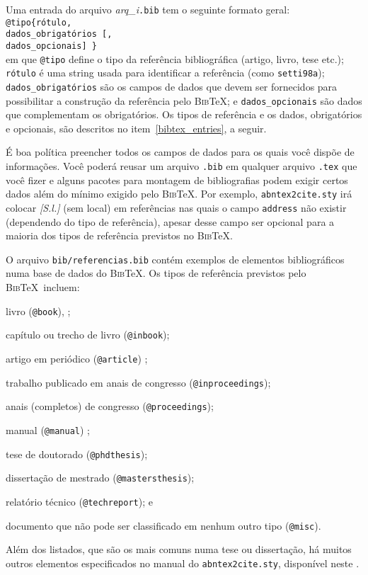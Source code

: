 Uma entrada do arquivo \emph{arq\_i}\texttt{.bib} tem o seguinte formato
geral:\\
\hspace*{3em}\verb|@tipo{rótulo,|\\
	\hspace*{5em}\verb|dados_obrigatórios [,|\\ 
	\hspace*{5em}\verb|dados_opcionais] }| \\
em que \verb|@tipo| define o tipo da referência 
   			bibliográfica (artigo, livro, tese etc.); 
	\texttt{rótulo} é uma string usada para 
			identificar a referência (como \texttt{setti98a});
	\texttt{dados\_obrigatórios} são os campos de dados que 
   			devem ser fornecidos para possibilitar a construção 
   			da referência pelo \textsc{Bib}\TeX; e
	\texttt{dados\_opcionais} são dados que complementam
     		os obrigatórios. 
Os tipos de referência e os dados, obrigatórios
e opcionais, são descritos no item~\ref{bibtex_entries}, a seguir.

É boa política preencher todos os campos de dados para os quais você
dispõe de informações. Você poderá reusar um arquivo \texttt{.bib} em
qualquer arquivo \texttt{.tex} que você fizer e alguns pacotes 
para montagem de bibliografias podem exigir certos dados além do
mínimo exigido pelo \textsc{Bib}\TeX. Por exemplo,  \texttt{abntex2cite.sty}
irá colocar \emph{[S.l.]} (sem local) em referências nas quais o campo 
\texttt{address} não existir (dependendo do tipo de referência), 
apesar desse campo ser opcional para a maioria dos tipos de referência
previstos no \textsc{Bib}\TeX.


O arquivo 
\texttt{bib/referencias.bib} contém exemplos de elementos bibliográficos
numa base de dados do \textsc{Bib}\TeX.{} Os tipos de referência previstos
pelo \textsc{Bib}\TeX\ incluem:
	\begin{alineas}
		\item livro (\verb|@book|),  \cite{kop95};
		\item capítulo ou trecho de livro (\verb|@inbook|);
		\item artigo em periódico (\verb|@article|) \cite{huey03};
		\item trabalho publicado em anais de congresso 
		(\verb|@inproceedings|);
		\item anais (completos) de congresso (\verb|@proceedings|);
		\item manual (\verb|@manual|) \cite{epslatex06};
		\item tese de doutorado (\verb|@phdthesis|);
		\item dissertação de mestrado (\verb|@mastersthesis|);
		\item relatório técnico (\verb|@techreport|); e
		\item documento que não pode ser classificado em
		nenhum outro tipo (\verb|@misc|).
	\end{alineas}
Além dos listados, que são os mais comuns numa tese ou
dissertação, há muitos outros elementos especificados
no manual do \texttt{abntex2cite.sty}, disponível neste 
\href{http://ctan.math.washington.edu/tex-archive/macros/latex/contrib/abntex2/doc/abntex2cite-alf.pdf}{}.

